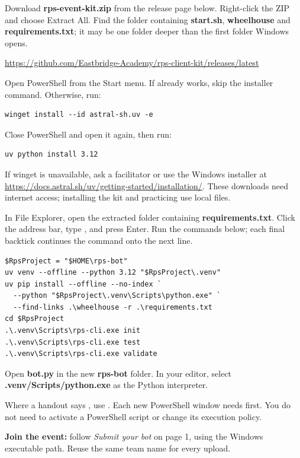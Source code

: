 
\begin{context}
Download \textbf{rps-event-kit.zip} from the release page below. Right-click the
ZIP and choose Extract All. Find the folder containing \textbf{start.sh},
\textbf{wheelhouse} and \textbf{requirements.txt}; it may be one folder deeper
than the first folder Windows opens.
\end{context}

{\small\url{https://github.com/Eastbridge-Academy/rps-client-kit/releases/latest}\par}

Open PowerShell from the Start menu. If  already works,
skip the installer command. Otherwise, run:

\begin{lstlisting}[style=plaincode]
winget install --id astral-sh.uv -e
\end{lstlisting}

Close PowerShell and open it again, then run:

\begin{lstlisting}[style=plaincode]
uv python install 3.12
\end{lstlisting}

If winget is unavailable, ask a facilitator or use the Windows installer at
\url{https://docs.astral.sh/uv/getting-started/installation/}.
These downloads need internet access; installing the kit and practicing use
local files.

In File Explorer, open the extracted folder containing \textbf{requirements.txt}.
Click the address bar, type , and press Enter. Run the commands
below; each final backtick continues the command onto the next line.

\begin{lstlisting}[style=plaincode]
$RpsProject = "$HOME\rps-bot"
uv venv --offline --python 3.12 "$RpsProject\.venv"
uv pip install --offline --no-index `
  --python "$RpsProject\.venv\Scripts\python.exe" `
  --find-links .\wheelhouse -r .\requirements.txt
cd $RpsProject
.\.venv\Scripts\rps-cli.exe init
.\.venv\Scripts\rps-cli.exe test
.\.venv\Scripts\rps-cli.exe validate
\end{lstlisting}

Open \textbf{bot.py} in the new \textbf{rps-bot} folder. In your editor, select
\textbf{.venv/Scripts/python.exe} as the Python interpreter.

Where a handout says , use
.
Each new PowerShell window needs 
first. You do not need to activate a PowerShell script or change its execution policy.

\begin{checkpoint}
\textbf{Join the event:} follow \emph{Submit your bot} on page 1, using the
Windows executable path. Reuse the same team name for every upload.
\end{checkpoint}
